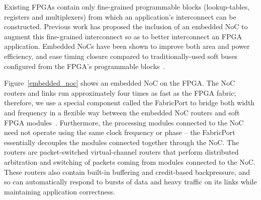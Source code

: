 


Existing FPGAs contain only fine-grained programmable blocks (lookup-tables, registers and multiplexers) from which an application's interconnect can be constructed.
Previous work has proposed the inclusion of an embedded NoC to augment this fine-grained interconnect so as to better interconnect an FPGA application. 
Embedded NoCs have been shown to improve both area and power efficiency, and ease timing closure compared to traditionally-used soft buses configured from the FPGA's programmable blocks~\cite{trets,tvlsi,micro}.

Figure~\ref{embedded_noc} shows an embedded NoC on the FPGA.
The NoC routers and links run approximately four times as fast as the FPGA fabric; therefore, we use a special component called the FabricPort to bridge both width and frequency in a flexible way between the embedded NoC routers and soft FPGA modules~\cite{abdelfattah2015take}.
Furthermore, the processing modules connected to the NoC need not operate using the same clock frequency or phase -- the FabricPort essentially decouples the modules connected together through the NoC.
The routers are packet-switched virtual-channel routers that perform distributed arbitration and switching of packets coming from modules connected to the NoC.
These routers also contain built-in buffering and credit-based backpressure, and so can automatically respond to bursts of data and heavy traffic on its links while maintaining application correctness.

